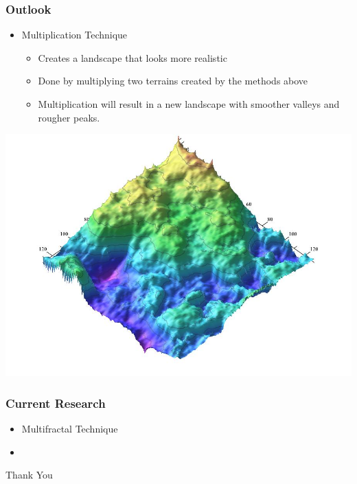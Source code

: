 \documentclass{beamer}
\begin{document}
  \begin{frame}
  \frametitle{Outlook}
  \begin{itemize}
    \item Multiplication Technique
    \begin{itemize}
    \item Creates a landscape that looks more realistic 
    \item Done by multiplying two terrains created by the methods above
    \item Multiplication will result in a new landscape with smoother valleys and rougher peaks.
    \end{itemize}
    \end{itemize}
    \begin{center}
    \includegraphics[scale=0.2]{multipliedterrain.jpg}
    \end{center}
\end{frame}

\begin{frame}
 \frametitle{Current Research}
\begin{itemize}
 \item Multifractal Technique
\item 
\end{itemize}
\end{frame}





\begin{frame}
 Thank You
\end{frame}


\end{document}
